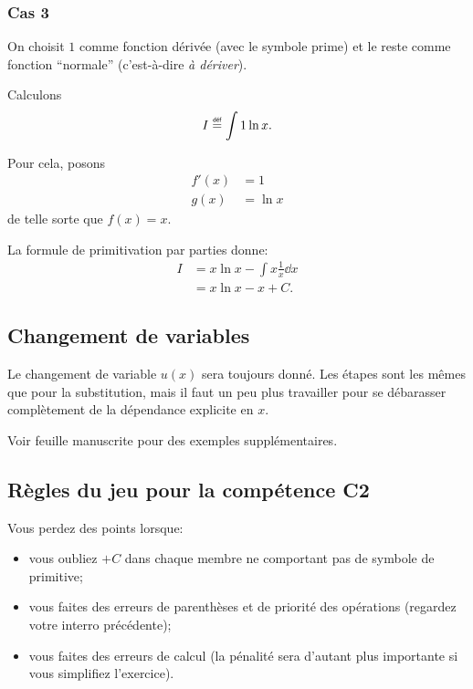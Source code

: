 \documentclass[main.tex]{subfiles}
\begin{document}
\subsubsection{Cas 3}

On choisit $1$ comme fonction dérivée (avec le symbole prime)
et le reste comme fonction ``normale'' (c'est-à-dire \emph{à dériver}).

\begin{example}
    Calculons
    \begin{align}
        I \defeq \int 1 \ln x.
    \end{align}

    Pour cela,
    posons
    \begin{align}
        f'(x) &= 1\\
        g(x) &= \ln x
    \end{align}
    de telle sorte que $f(x) = x$.

    La formule de primitivation par parties donne:
    \begin{align}
        I &= x \ln x - \int x \frac 1 x \dd x\\
          &= x \ln x - x + C.
    \end{align}
\end{example}

\subsection{Changement de variables}

Le changement de variable $u(x)$ sera toujours donné.
Les étapes sont les mêmes que pour la substitution,
mais il faut un peu plus travailler pour se débarasser complètement
de la dépendance explicite en $x$.

Voir feuille manuscrite pour des exemples supplémentaires.

\subsection{Règles du jeu pour la compétence C2}

Vous perdez des points lorsque:

\begin{itemize}
    \item vous oubliez $+ C$ dans chaque membre ne comportant pas de symbole de primitive;
    \item vous faites des erreurs de parenthèses et de priorité des opérations (regardez votre interro précédente);
    \item vous faites des erreurs de calcul (la pénalité sera d'autant plus importante si vous simplifiez l'exercice).
\end{itemize}
\end{document}
